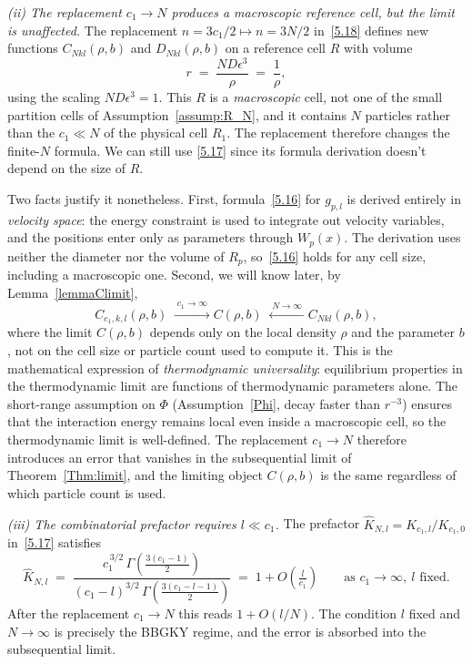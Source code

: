 \documentclass[11pt]{article}
\begin{document}
\noindent\textit{(ii) The replacement $c_1 \to N$ produces a
macroscopic reference cell, but the limit is unaffected.}
The replacement $n = 3c_1/2 \mapsto n = 3N/2$ in~\eqref{5.18}
defines new functions $C_{Nkl}(\rho,b)$ and $D_{Nkl}(\rho,b)$
on a reference cell $R$ with volume
\begin{equation*}
  r \;=\; \frac{ND\epsilon^3}{\rho} \;=\; \frac{1}{\rho},
\end{equation*}
using the scaling $ND\epsilon^3 = 1$.
This $R$ is a \emph{macroscopic} cell, not one of the small
partition cells of Assumption~\ref{assump:R_N}, and it
contains $N$ particles rather than the $c_1 \ll N$ of the
physical cell $R_1$.
The replacement therefore changes the finite-$N$ formula. We can still use \eqref{5.17} since its formula derivation doesn't depend on the size of $R$. 

Two facts justify it nonetheless.
First, formula~\eqref{5.16} for $g_{p,l}$ is derived
entirely in \emph{velocity space}: the energy constraint
is used to integrate out velocity variables, and the
positions enter only as parameters through $W_p(x)$.
The derivation uses neither the diameter nor the
volume of $R_p$, so~\eqref{5.16} holds for any cell
size, including a macroscopic one.
Second, we will know later, by Lemma~\ref{lemmaClimit},
\begin{equation*}
  C_{c_1,k,l}(\rho,b)
  \;\xrightarrow{\;c_1\to\infty\;}
  C(\rho,b)
  \;\xleftarrow{\;N\to\infty\;}
  C_{Nkl}(\rho,b),
\end{equation*}
where the limit $C(\rho,b)$ depends only on the local
density $\rho$ and the parameter $b$, not on the cell size
or particle count used to compute it.
This is the mathematical expression of \emph{thermodynamic
universality}: equilibrium properties in the thermodynamic
limit are functions of thermodynamic parameters alone.
The short-range assumption on $\Phi$ (Assumption~\ref{Phi},
decay faster than $r^{-3}$) ensures that the interaction
energy remains local even inside a macroscopic cell,
so the thermodynamic limit is well-defined.
The replacement $c_1 \to N$ therefore introduces an error
that vanishes in the subsequential limit of
Theorem~\ref{Thm:limit}, and the limiting object
$C(\rho,b)$ is the same regardless of which particle
count is used.

\noindent\textit{(iii) The combinatorial prefactor requires
$l \ll c_1$.}
The prefactor $\hat{K}_{N,l} = K_{c_1,l}/K_{c_1,0}$
in~\eqref{5.17} satisfies
\begin{equation*}
  \hat{K}_{N,l}
  \;=\;
  \frac{c_1^{\,3/2}\,
        \Gamma\!\left(\tfrac{3(c_1-1)}{2}\right)}
       {(c_1-l)^{3/2}\,
        \Gamma\!\left(\tfrac{3(c_1-l-1)}{2}\right)}
  \;=\;
  1 + O\!\left(\tfrac{l}{c_1}\right)
  \qquad \text{as } c_1 \to \infty,\ l \text{ fixed.}
\end{equation*}
After the replacement $c_1 \to N$ this reads
$1 + O(l/N)$.
The condition $l$ fixed and $N \to \infty$ is precisely
the BBGKY regime, and the error is absorbed into the
subsequential limit.
\end{document}
